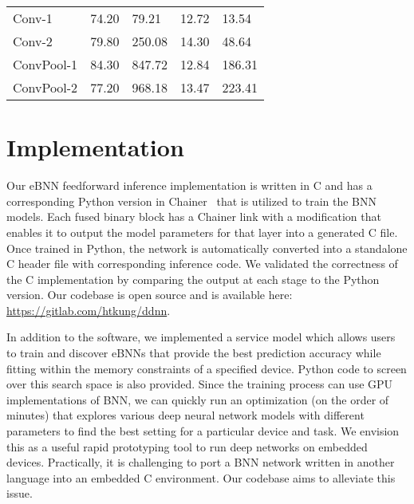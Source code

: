 \documentclass[10pt,emptycopyrightspace]{ewsn-proc}
\begin{document}
\begin{table}[htp]
\begin{tabular}{ lllll }
\rowcolor{maroon!5}  Conv-1        & 74.20              & 79.21                 & 12.72              &  13.54                        \\
\rowcolor{maroon!5}  Conv-2        & 79.80              & 250.08                & 14.30              &  48.64                        \\
\rowcolor{maroon!20} ConvPool-1    & 84.30              & 847.72                & 12.84              &  186.31                        \\
\rowcolor{maroon!20} ConvPool-2    & 77.20              & 968.18                & 13.47              &  223.41                        \\\hline
\end{tabular}
\end{table}

\section{Implementation}
\label{sec:service}
Our eBNN feedforward inference implementation is written in C and has a corresponding Python version in Chainer~\cite{chainer_learningsys2015} that is utilized to train the BNN models. Each fused binary block has a Chainer link with a modification that enables it to output the model parameters for that layer into a generated C file. Once trained in Python, the network is automatically converted into a standalone C header file with corresponding inference code. We validated the correctness of the C implementation by comparing the output at each stage to the Python version. Our codebase is open source and is available here: \url{https://gitlab.com/htkung/ddnn}.

In addition to the software, we implemented a service model which allows users to train and discover eBNNs that provide the best prediction accuracy while fitting within the memory constraints of a specified device. Python code to screen over this search space is also provided. Since the training process can use GPU implementations of BNN, we can quickly run an optimization (on the order of minutes) that explores various deep neural network models with different parameters to find the best setting for a particular device and task. We envision this as a useful rapid prototyping tool to run deep networks on embedded devices. Practically, it is challenging to port a BNN network written in another language into an embedded C environment. Our codebase aims to alleviate this issue. 
\end{document}
